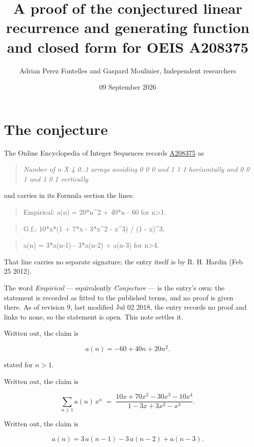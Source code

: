\documentclass[11pt]{article}
\title{A proof of the conjectured linear recurrence and generating function and closed form for OEIS A208375}
\author{Adrian Perez Fontelles and Gaspard Moulinier, Independent researchers}
\date{09 September 2026}
\theoremstyle{definition}
\begin{document}
\maketitle
\section{The conjecture}

The Online Encyclopedia of Integer Sequences records \href{https://oeis.org/A208375}{A208375} as

\begin{quote}\itshape Number of n X 4 0..1 arrays avoiding 0 0 0 and 1 1 1 horizontally and 0 0 1 and 1 0 1 vertically\end{quote}

and carries in its Formula section the lines:

\begin{quote}\ttfamily Empirical: a(n) = 20*n\textasciicircum{}2 + 40*n - 60 for n>1.\end{quote}

\begin{quote}\ttfamily G.f.: 10*x*(1 + 7*x - 3*x\textasciicircum{}2 - x\textasciicircum{}3) / (1 - x)\textasciicircum{}3.\end{quote}

\begin{quote}\ttfamily a(n) = 3*a(n-1) - 3*a(n-2) + a(n-3) for n>4.\end{quote}

That line carries no separate signature; the entry itself is by R. H. Hardin (Feb 25 2012).

The word {\itshape Empirical} --- equivalently {\itshape Conjecture} --- is the entry's own: the statement is recorded as fitted to the published terms, and no proof is given there. As of revision 9, last modified Jul 02 2018, the entry records no proof and links to none, so the statement is open. This note settles it.

Written out, the claim is

\[a(n) = -60 + 40n + 20n^{2}.\]

stated for $n > 1$.

Written out, the claim is

\[\sum_{n \ge 1} a(n)\,x^n \;=\; \frac{10x + 70x^{2} - 30x^{3} - 10x^{4}}{1 - 3x + 3x^{2} - x^{3}}.\]

Written out, the claim is

\[a(n) = 3\,a(n-1) - 3\,a(n-2) + a(n-3).\]
\end{document}
